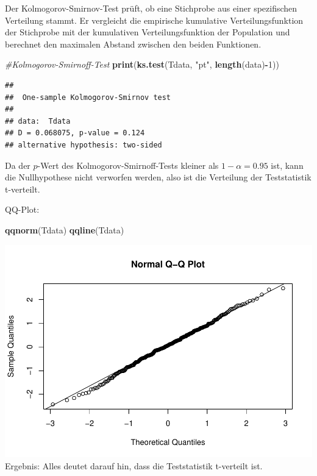 \documentclass[]{article}
\newenvironment{Shaded}{\begin{snugshade}}{\end{snugshade}}
\newcommand{\CommentTok}[1]{\textcolor[rgb]{0.56,0.35,0.01}{\textit{#1}}}
\newcommand{\DecValTok}[1]{\textcolor[rgb]{0.00,0.00,0.81}{#1}}
\newcommand{\KeywordTok}[1]{\textcolor[rgb]{0.13,0.29,0.53}{\textbf{#1}}}
\newcommand{\NormalTok}[1]{#1}
\newcommand{\OperatorTok}[1]{\textcolor[rgb]{0.81,0.36,0.00}{\textbf{#1}}}
\newcommand{\StringTok}[1]{\textcolor[rgb]{0.31,0.60,0.02}{#1}}
\begin{document}
Der Kolmogorov-Smirnov-Test prüft, ob eine Stichprobe aus einer spezifischen Verteilung stammt.
Er vergleicht die empirische kumulative Verteilungsfunktion der Stichprobe mit der kumulativen
Verteilungsfunktion der Population und berechnet den maximalen Abstand zwischen den beiden Funktionen.

\begin{Shaded}
\begin{Highlighting}[]
\CommentTok{#Kolmogorov-Smirnoff-Test}
\KeywordTok{print}\NormalTok{(}\KeywordTok{ks.test}\NormalTok{(Tdata, }\StringTok{"pt"}\NormalTok{, }\KeywordTok{length}\NormalTok{(data)}\OperatorTok{-}\DecValTok{1}\NormalTok{))}
\end{Highlighting}
\end{Shaded}

\begin{verbatim}
## 
##  One-sample Kolmogorov-Smirnov test
## 
## data:  Tdata
## D = 0.068075, p-value = 0.124
## alternative hypothesis: two-sided
\end{verbatim}

Da der \(p\)-Wert des Kolmogorov-Smirnoff-Tests kleiner als \(1-\alpha=0.95\) ist, kann die Nullhypothese nicht verworfen werden,
also ist die Verteilung der Teststatistik t-verteilt.

QQ-Plot:

\begin{Shaded}
\begin{Highlighting}[]
\KeywordTok{qqnorm}\NormalTok{(Tdata)}
\KeywordTok{qqline}\NormalTok{(Tdata)}
\end{Highlighting}
\end{Shaded}

\includegraphics{BelaSchinkeAusarbeitung_files/figure-latex/unnamed-chunk-7-1.pdf}
Ergebnis: Alles deutet darauf hin, dass die Teststatistik t-verteilt ist.
\end{document}
